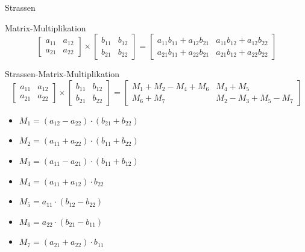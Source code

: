 \documentclass{beamer}
\begin{document}
	\begin{frame}{Strassen}
		\begin{block}{Matrix-Multiplikation}
			$$
			\begin{bmatrix}
				a_{11} & a_{12}\\
				a_{21} & a_{22} 
			\end{bmatrix}
			\times
			\begin{bmatrix}
				b_{11} & b_{12}\\
				b_{21} & b_{22}
			\end{bmatrix}
			=
			\begin{bmatrix}
				a_{11} b_{11}  + a_{12} b_{21} & a_{11} b_{12} + a_{12} b_{22}\\
				a_{21} b_{11} + a_{22} b_{21} & a_{21} b_{12} + a_{22} b_{22}
			\end{bmatrix}
			$$
		\end{block}
		\pause
		\begin{block}{Strassen-Matrix-Multiplikation}
			$$
			\begin{bmatrix}
				a_{11} & a_{12}\\
				a_{21} & a_{22} 
			\end{bmatrix}
			\times
			\begin{bmatrix}
				b_{11} & b_{12}\\
				b_{21} & b_{22}
			\end{bmatrix}
			=
			\begin{bmatrix}
				M_{1} + M_{2} - M_{4} + M_{6} & M_{4} + M_{5}\\
				M_{6} + M_{7} & M_{2} - M_{3} + M_{5} - M_{7}
			\end{bmatrix}
			$$	
		\end{block}
		\pause
		\begin{itemize}
			\item $M_{1} = (a_{12} - a_{22}) \cdot (b_{21} + b_{22})$ 
			\item $M_{2} = (a_{11} + a_{22}) \cdot (b_{11} + b_{22})$
			\item $M_{3} = (a_{11} - a_{21}) \cdot (b_{11} + b_{12})$
			\item $M_{4} = (a_{11} + a_{12}) \cdot b_{22}$
			\item $M_{5} = a_{11} \cdot (b_{12} - b_{22})$
			\item $M_{6} = a_{22} \cdot (b_{21} - b_{11})$
			\item $M_{7} = (a_{21} + a_{22}) \cdot b_{11}$
		\end{itemize}
	\end{frame}
\end{document}
